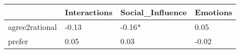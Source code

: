 \begin{tabular}{llll}
\toprule
{} & Interactions & Social\_Influence & Emotions \\
\midrule
agree2rational &        -0.13 &           -0.16* &     0.05 \\
prefer         &         0.05 &             0.03 &    -0.02 \\
\bottomrule
\end{tabular}
